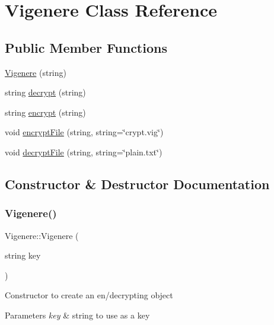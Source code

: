 \hypertarget{classVigenere}{}\section{Vigenere Class Reference}
\label{classVigenere}
\subsection*{Public Member Functions}
\begin{DoxyCompactItemize}
\item 
\hyperlink{classVigenere_a3196a2902aa64dde58b84c76a4fb351d}{Vigenere} (string)
\item 
string \hyperlink{classVigenere_a5b73ebb7eed8709e608da556ec3633fa}{decrypt} (string)
\item 
string \hyperlink{classVigenere_ae41574ecb94277c69204a8937a061b15}{encrypt} (string)
\item 
void \hyperlink{classVigenere_ac0ee004df7b389284c9aaa90c7dbcf76}{encrypt\+File} (string, string=\char`\"{}crypt.\+vig\char`\"{})
\item 
void \hyperlink{classVigenere_ad5a357194e5b113037f56adc0602f0b3}{decrypt\+File} (string, string=\char`\"{}plain.\+txt\char`\"{})
\end{DoxyCompactItemize}


\subsection{Constructor \& Destructor Documentation}
\mbox{\label{classVigenere_a3196a2902aa64dde58b84c76a4fb351d}} 
\subsubsection{\texorpdfstring{Vigenere()}{Vigenere()}}
{\footnotesize\ttfamily Vigenere\+::\+Vigenere (\begin{DoxyParamCaption}\item[{string}]{key }\end{DoxyParamCaption})}

Constructor to create an en/decrypting object


\begin{DoxyParams}{Parameters}
{\em key} & string to use as a key \\
\hline
\end{DoxyParams}


